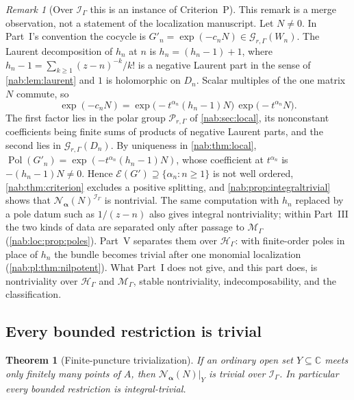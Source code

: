 \documentclass[11pt,letterpaper]{article}
\newtheorem{theorem}{Theorem}[section]
\theoremstyle{definition}
\theoremstyle{remark}
\newtheorem{remark}[remark]{Remark}
\newcommand{\C}{\mathbb C}
\newcommand{\HH}{\mathscr H_\Gamma}
\newcommand{\II}{\mathscr I_\Gamma}
\newcommand{\GG}{\mathscr G_{r,\Gamma}}
\newcommand{\Pol}{\operatorname{Pol}}
\newcommand{\EU}{\mathcal E}
\newcommand{\MM}{\mathscr M_\Gamma}
\newcommand{\profile}{\boldsymbol\alpha}
\numberwithin{equation}{section}
\begin{document}
\begin{remark}[Over $\II$ this is an instance of Criterion~P]
\label{nab:loc:rem:criterionP}
This remark is a merge observation, not a statement of the localization
manuscript. Let $N\neq0$. In Part~I's convention the cocycle is
$G'_n=\exp(-c_nN)\in\GG(W_n)$. The Laurent decomposition of $h_n$ at $n$ is
$h_n=(h_n-1)+1$, where $h_n-1=\sum_{k\geq1}(z-n)^{-k}/k!$ is a negative
Laurent part in the sense of \cref{nab:lem:laurent} and $1$ is holomorphic on
$D_n$. Scalar multiples of the one matrix $N$ commute, so
\[
 \exp(-c_nN)=\exp\bigl(-t^{\alpha_n}(h_n-1)N\bigr)\,
             \exp\bigl(-t^{\alpha_n}N\bigr).
\]
The first factor lies in the polar group $\mathscr P_{r,\Gamma}$ of
\cref{nab:sec:local}, its nonconstant coefficients being finite sums of
products of negative Laurent parts, and the second lies in $\GG(D_n)$. By
uniqueness in \cref{nab:thm:local},
$\Pol(G'_n)=\exp(-t^{\alpha_n}(h_n-1)N)$, whose coefficient at $t^{\alpha_n}$
is $-(h_n-1)N\neq0$. Hence $\EU(G')\supseteq\{\alpha_n:n\geq1\}$ is not well
ordered, \cref{nab:thm:criterion} excludes a positive splitting, and
\cref{nab:prop:integraltrivial} shows that $\mathcal N_{\profile}(N)^{\II}$ is
nontrivial. The same computation with $h_n$ replaced by a pole datum such as
$1/(z-n)$ also gives integral nontriviality; within Part~III the two kinds
of data are separated only after passage to $\MM$ (\cref{nab:loc:prop:poles}).
Part~V separates them over $\HH$: with finite-order poles in place of $h_n$ the
bundle becomes trivial after one monomial localization
(\cref{nab:pl:thm:nilpotent}). What Part~I does not give, and
this part does, is nontriviality over $\HH$ and $\MM$, stable nontriviality,
indecomposability, and the classification.
\end{remark}

\subsection{Every bounded restriction is trivial}

\begin{theorem}[Finite-puncture trivialization]\label{nab:loc:thm:bounded}
If an ordinary open set $Y\subseteq\C$ meets only finitely many points of $A$,
then $\mathcal N_{\profile}(N)|_Y$ is trivial over $\II$. In particular every
bounded restriction is integral-trivial.
\end{theorem}
\end{document}
